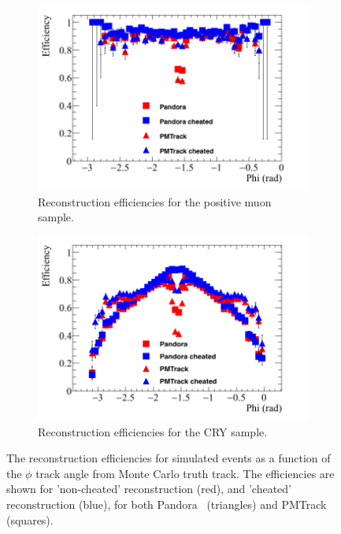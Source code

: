 \begin{figure}
  \centering
  \begin{subfigure}{0.48\textwidth}
    \centering
    \includegraphics[width=\textwidth]{Effic_AntiMuon_500V_All_Phi}
    \caption{Reconstruction efficiencies for the positive muon sample.}
    \label{fig:SimEffic_Phi_AMu}
  \end{subfigure}%
  \hspace{0.03\textwidth}%
  \begin{subfigure}{0.48\textwidth}
    \centering
    \includegraphics[width=\textwidth]{Effic_Cosmics_500V_All_Phi}
    \caption{Reconstruction efficiencies for the CRY sample.}
    \label{fig:SimEffic_Phi_CRY}
  \end{subfigure}
  \caption[The reconstruction efficiencies for simulated events as a function of the $\phi$ track angle from Monte Carlo truth track.]
          {The reconstruction efficiencies for simulated events as a function of the $\phi$ track angle from Monte Carlo truth track. The efficiencies are shown for 'non-cheated' reconstruction (red), and 'cheated' reconstruction (blue), for both Pandora~\citep{Pandora} (triangles) and PMTrack~\citep{PMTrack} (squares).}
          \label{fig:SimEffic_Phi}
\end{figure}

